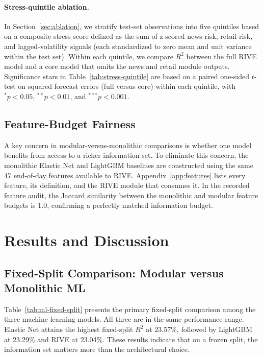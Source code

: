 \documentclass[review]{elsarticle}
\begin{document}
\paragraph{Stress-quintile ablation.}
In Section~\ref{sec:ablation}, we stratify test-set observations into five quintiles based on a composite stress score defined as the sum of z-scored news-risk, retail-risk, and lagged-volatility signals (each standardized to zero mean and unit variance within the test set). Within each quintile, we compare $R^2$ between the full RIVE model and a core model that omits the news and retail module outputs. Significance stars in Table~\ref{tab:stress-quintile} are based on a paired one-sided $t$-test on squared forecast errors (full versus core) within each quintile, with $^{*}p<0.05$, $^{**}p<0.01$, and $^{***}p<0.001$.

\subsection{Feature-Budget Fairness}\label{implementation}

A key concern in modular-versus-monolithic comparisons is whether one model benefits from access to a richer information set. To eliminate this concern, the monolithic Elastic Net and LightGBM baselines are constructed using the same 47 end-of-day features available to RIVE. Appendix~\ref{app:features} lists every feature, its definition, and the RIVE module that consumes it. In the recorded feature audit, the Jaccard similarity between the monolithic and modular feature budgets is 1.0, confirming a perfectly matched information budget.

\section{Results and Discussion}\label{sec:results}

\subsection{Fixed-Split Comparison: Modular versus Monolithic ML}\label{sec:fixed-split-ml}

Table~\ref{tab:ml-fixed-split} presents the primary fixed-split comparison among the three machine learning models. All three are in the same performance range. Elastic Net attains the highest fixed-split $R^2$ at 23.57\%, followed by LightGBM at 23.29\% and RIVE at 23.04\%. These results indicate that on a frozen split, the information set matters more than the architectural choice.
\end{document}
